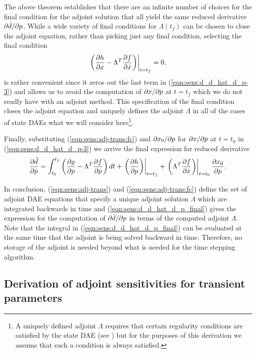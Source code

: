 \documentclass[pdf,ps2pdf,11pt]{SANDreport}
\begin{document}
The above theorem establishes that there are an infinite number of choices for
the final condition for the adjoint solution that all yield the same reduced
derivative $\partial \hat{d} / \partial p$.  While a wide variety of final conditions for
$\Lambda(t_f)$ can be chosen to close the adjoint equation, rather than
picking just any final condition, selecting the final condition
%
\begin{equation}
\left. \left(
  \displaystyle{\frac{\partial h}{\partial x}} - \Lambda^T \displaystyle{\frac{\partial f}{\partial \dot{x}}}
\right) \right|_{t=t_f}
 = 0,
\label{eqn:sens:adj-trans:fc}
\end{equation}
%
is rather convenient since it zeros out the last term in
(\ref{eqn:sens:d_d_hat_d_p-3}) and allows us to avoid the computation of
$\partial x / \partial p$ at $t=t_f$ which we do not readly have with an adjoint method.
This specification of the final condition closes the adjoint equation and
uniquely defines the adjoint $\Lambda$ in all of the cases of state DAEs what
we will consider here\footnote{A uniquely defined adjoint $\Lambda$ requires
that certain regularity conditions are satisfied by the state DAE (see
{}\cite{adjoint-sens-2003}) but for the purposes of this derivation we assume
that such a condition is always satisfied.}.

Finally, substituting (\ref{eqn:sens:adj-trans:fc}) and
$\partial x_0 / \partial p$ for $\partial x / \partial p$ at $t=t_0$ in
(\ref{eqn:sens:d_d_hat_d_p-3}) we arrive the final expression for
reduced derivative
%
\begin{equation}
\displaystyle{\frac{\partial \hat{d}}{\partial p}} =
\int_{t_0}^{t_f} \left(
    \displaystyle{\frac{\partial g}{\partial p}}
    - \Lambda^T \displaystyle{\frac{\partial f}{\partial p}}
  \right) dt
  + \left. \left( \displaystyle{\frac{\partial h}{\partial p}} \right) \right|_{t=t_f}
  + \left. \left( \Lambda^T \displaystyle{\frac{\partial f}{\partial \dot{x}}} \right) \right|_{t=t_0} \displaystyle{\frac{\partial x_0}{\partial p}}.
\label{eqn:sens:d_d_hat_d_p_final}
\end{equation}

In conclusion, (\ref{eqn:sens:adj-trans}) and (\ref{eqn:sens:adj-trans:fc})
define the set of adjoint DAE equations that specify a unique adjoint solution
$\Lambda$ which are integrated backwards in time and
(\ref{eqn:sens:d_d_hat_d_p_final}) gives the expression for the computation of
$\partial \hat{d} / \partial p$ in terms of the computed adjoint $\Lambda$.  Note that the
integral in (\ref{eqn:sens:d_d_hat_d_p_final}) can be evaluated at the same
time that the adjoint is being solved backward in time.  Therefore, no storage
of the adjoint is needed beyond what is needed for the time stepping
algorithm.

\subsection{Derivation of adjoint sensitivities for transient parameters}
\end{document}
